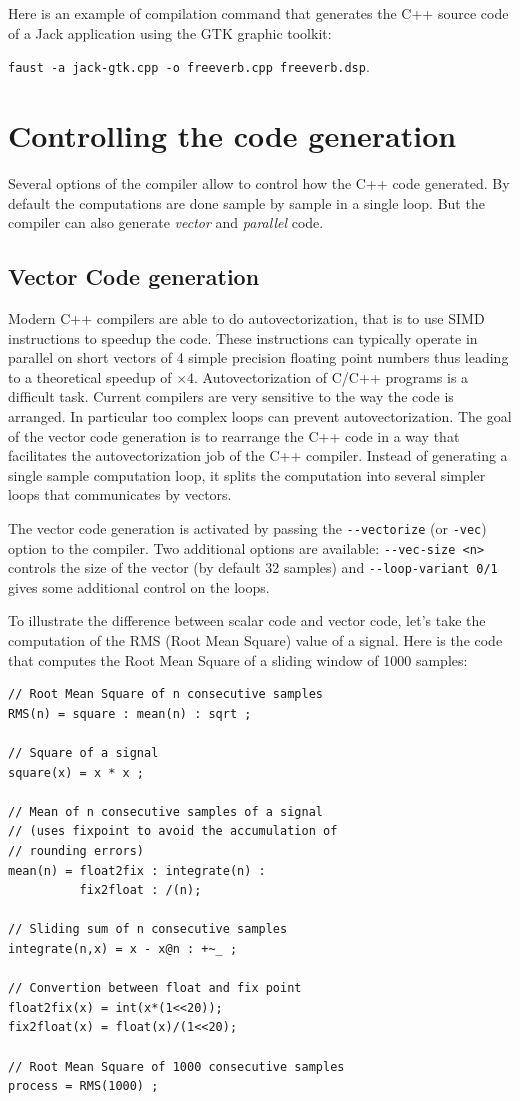 \documentclass[a4paper]{book}
\begin{document}
\bigskip

Here is an example of compilation command that generates the C++ source code of a Jack application using the GTK graphic toolkit:

\texttt{faust -a jack-gtk.cpp -o freeverb.cpp freeverb.dsp}.

\bigskip

\chapter{Controlling the code generation}
Several options of the \faust compiler allow to control how the C++ code generated. By default the computations are done sample by sample in a single loop. But the compiler can also generate \textit{vector} and \textit{parallel} code.


\section{Vector Code generation}
Modern C++ compilers are able to do autovectorization, that is to use SIMD instructions to speedup the code. These instructions can typically operate in parallel on short vectors of 4 simple precision floating point numbers thus leading to a theoretical speedup of $\times4$. 
Autovectorization of C/C++ programs is a difficult task. Current compilers are very sensitive to the way the code is arranged. In particular too complex loops can prevent autovectorization. The goal of the vector code generation is to rearrange the C++ code in a way that facilitates the autovectorization job of the C++ compiler. Instead of generating a single sample computation loop, it splits the computation into several simpler loops that communicates by vectors.

The vector code generation is activated by passing the \lstinline!--vectorize! (or \lstinline!-vec!) option to the \faust compiler. Two additional options are available:  \lstinline!--vec-size <n>! controls the size of the vector (by default 32 samples) and \lstinline!--loop-variant 0/1! gives some additional control on the loops.  

To illustrate the difference between scalar code and vector code, let's take the computation of the RMS (Root Mean Square) value of a signal.  Here is the \faust code that computes the Root Mean Square of a sliding window of 1000 samples:
\label{rms}
\begin{lstlisting}
// Root Mean Square of n consecutive samples
RMS(n) = square : mean(n) : sqrt ;

// Square of a signal
square(x) = x * x ;

// Mean of n consecutive samples of a signal
// (uses fixpoint to avoid the accumulation of
// rounding errors) 
mean(n) = float2fix : integrate(n) : 
          fix2float : /(n); 

// Sliding sum of n consecutive samples
integrate(n,x) = x - x@n : +~_ ;

// Convertion between float and fix point
float2fix(x) = int(x*(1<<20));      
fix2float(x) = float(x)/(1<<20);    

// Root Mean Square of 1000 consecutive samples
process = RMS(1000) ;
\end{lstlisting}
\end{document}
